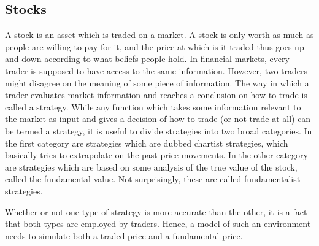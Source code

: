 \subsection{Stocks}
A stock is an asset which is traded on a market. A stock is only worth as much as people are willing to pay for it, and the price at which is it traded thus goes up and down according to what beliefs people hold. In financial markets, every trader is supposed to have access to the same information. However, two traders might disagree on the meaning of some piece of information. The way in which a trader evaluates market information and reaches a conclusion on how to trade is called a strategy. While any function which takes some information relevant to the market as input and gives a decision of how to trade (or not trade at all) can be termed a strategy, it is useful to divide strategies into two broad categories. In the first category are strategies which are dubbed chartist strategies, which basically tries to extrapolate on the past price movements. In the other category are strategies which are based on some analysis of the true value of the stock, called the fundamental value. Not surprisingly, these are called fundamentalist strategies. 

Whether or not one type of strategy is more accurate than the other, it is a fact that both types are employed by traders. Hence, a model of such an environment needs to simulate both a traded price and a fundamental price. 

